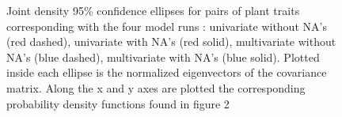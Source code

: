 \documentclass[12pt,fleqn]{article}
\begin{document}
\begin{figure}[h]
  \caption{Joint density 95\% confidence ellipses for pairs of plant traits corresponding with the four model runs : univariate without NA's (red dashed), univariate with NA's (red solid), multivariate without NA's (blue dashed), multivariate with NA's (blue solid). Plotted inside each ellipse is the normalized eigenvectors of the covariance matrix. Along the x and y axes are plotted the corresponding probability density functions found in figure 2}
  \label{fig:key}
\end{figure}
\end{document}
